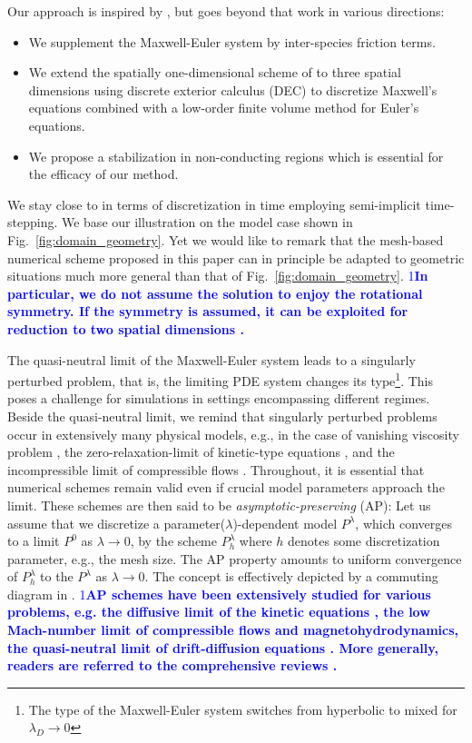 \documentclass{article}
\def\ifUpdate{1}
\newcommand{\review}[1]{\textcolor{blue}{\if\ifUpdate1\textbf{#1}\fi}}
\begin{document}
Our approach is inspired by \cite{degond_2012}, but goes beyond that work in various directions:
\begin{itemize}
\item We supplement the Maxwell-Euler system by inter-species friction terms.
\item We extend the spatially one-dimensional scheme of \cite{degond_2012} to three
  spatial dimensions using discrete exterior calculus (DEC) to discretize Maxwell's
  equations combined with a low-order finite volume method for Euler's equations.
\item We propose a stabilization in non-conducting regions which is essential for the
  efficacy of our method.
\end{itemize}

We stay close to \cite{degond_2012} in terms of discretization in time employing
semi-implicit time-stepping. We base our illustration on the model case shown
in Fig.~\ref{fig:domain_geometry}. Yet we would like to remark that the mesh-based numerical
scheme proposed in this paper can in principle be adapted to geometric situations much
more general than that of Fig.~\ref{fig:domain_geometry}. \review{In particular, we do not 
assume the solution to enjoy the rotational symmetry. If the symmetry is assumed, 
it can be exploited for reduction to two spatial dimensions \cite{bonotto_2022}.}

The quasi-neutral limit of the Maxwell-Euler system leads to a singularly perturbed
problem, that is, the limiting PDE system changes its type\footnote{The type of the
  Maxwell-Euler system switches from hyperbolic to mixed for $\lambda_{D}\to 0$}. This
poses a challenge for simulations in settings encompassing different regimes. 
Beside the quasi-neutral limit, we remind
that singularly perturbed problems occur in extensively many physical models, 
e.g., in the case of vanishing viscosity problem \cite{Kato_1984, bianchini_2005, temam_1997}, the
zero-relaxation-limit of kinetic-type equations \cite{raymond_2009, degond_1996}, and the incompressible limit
of compressible flows \cite{klainerman_1981}. Throughout, it is essential that
numerical schemes remain valid even if crucial model parameters approach the limit. These
schemes are then said to be \emph{asymptotic-preserving} (AP): Let us assume that we
discretize a parameter($\lambda$)-dependent model $P^\lambda$, which converges to a limit
$P^0$ as $\lambda \rightarrow 0$, by the scheme $P^\lambda_h$ where $h$ denotes some
discretization parameter, e.g., the mesh size. The AP property amounts to uniform
convergence of $P^\lambda_h$ to the $P^\lambda$ as $\lambda\rightarrow0$. 
The concept is effectively depicted by a commuting diagram in \cite[][Fig.~1]{jin_2010}. 
\review{AP schemes have been extensively studied for various problems, e.g. the diffusive limit of the kinetic equations \cite{jin_1999, liu_2023}, 
the low Mach-number limit of compressible flows \cite{degond_2007, haack_2010} and magnetohydrodynamics\cite{chen_2023}, 
the quasi-neutral limit of drift-diffusion equations \cite{chatard_2014, claire_2007}. 
More generally, readers are referred to the comprehensive reviews \cite{jin_2010, degond_2017}.}
\end{document}
